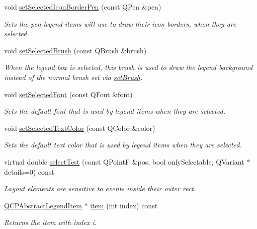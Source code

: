 \begin{DoxyCompactItemize}
void \hyperlink{classQCPLegend_ade93aabe9bcccaf9cf46cec22c658027}{set\+Selected\+Icon\+Border\+Pen} (const Q\+Pen \&pen)
\begin{DoxyCompactList}\small\item\em Sets the pen legend items will use to draw their icon borders, when they are selected. \end{DoxyCompactList}\item 
void \hyperlink{classQCPLegend_a875227f3219c9799464631dec5e8f1bd}{set\+Selected\+Brush} (const Q\+Brush \&brush)
\begin{DoxyCompactList}\small\item\em When the legend box is selected, this brush is used to draw the legend background instead of the normal brush set via \hyperlink{classQCPLegend_a497bbcd38baa3598c08e2b3f48103f23}{set\+Brush}. \end{DoxyCompactList}\item 
void \hyperlink{classQCPLegend_ab580a01c3c0a239374ed66c29edf5ad2}{set\+Selected\+Font} (const Q\+Font \&font)
\begin{DoxyCompactList}\small\item\em Sets the default font that is used by legend items when they are selected. \end{DoxyCompactList}\item 
void \hyperlink{classQCPLegend_a7674dfc7a1f30e1abd1018c0ed45e0bc}{set\+Selected\+Text\+Color} (const Q\+Color \&color)
\begin{DoxyCompactList}\small\item\em Sets the default text color that is used by legend items when they are selected. \end{DoxyCompactList}\item 
virtual double \hyperlink{classQCPLegend_aa3892801051bc7b985e003576df844db}{select\+Test} (const Q\+Point\+F \&pos, bool only\+Selectable, Q\+Variant $\ast$details=0) const 
\begin{DoxyCompactList}\small\item\em Layout elements are sensitive to events inside their outer rect. \end{DoxyCompactList}\item 
\hyperlink{classQCPAbstractLegendItem}{Q\+C\+P\+Abstract\+Legend\+Item} $\ast$ \hyperlink{classQCPLegend_a454272d7094437beb3278a2294006da5}{item} (int index) const 
\begin{DoxyCompactList}\small\item\em Returns the item with index {\itshape i}. \end{DoxyCompactList}\item 

\end{DoxyCompactItemize}
